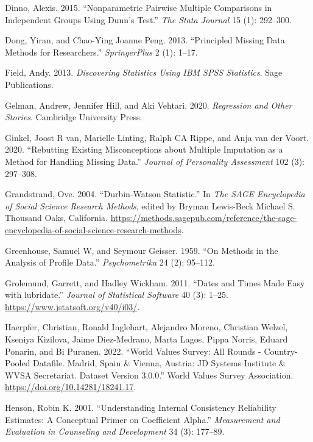 \documentclass[
  letterpaper,
]{krantz}
\newlength{\cslhangindent}
\newenvironment{CSLReferences}[2] %
 {\begin{list}{}{%
  \setlength{\itemindent}{0pt}
  \setlength{\leftmargin}{0pt}
  \setlength{\parsep}{0pt}
  \ifodd #1
   \setlength{\leftmargin}{\cslhangindent}
   \setlength{\itemindent}{-1\cslhangindent}
  \fi
  \setlength{\itemsep}{#2\baselineskip}}}
 {\end{list}}
\begin{document}
\begin{CSLReferences}{1}{0}
Dinno, Alexis. 2015. {``Nonparametric Pairwise Multiple Comparisons in
Independent Groups Using Dunn's Test.''} \emph{The Stata Journal} 15
(1): 292--300.

Dong, Yiran, and Chao-Ying Joanne Peng. 2013. {``Principled Missing Data
Methods for Researchers.''} \emph{SpringerPlus} 2 (1): 1--17.

Field, Andy. 2013. \emph{Discovering Statistics Using IBM SPSS
Statistics}. Sage Publications.

Gelman, Andrew, Jennifer Hill, and Aki Vehtari. 2020. \emph{Regression
and Other Stories}. Cambridge University Press.

Ginkel, Joost R van, Marielle Linting, Ralph CA Rippe, and Anja van der
Voort. 2020. {``Rebutting Existing Misconceptions about Multiple
Imputation as a Method for Handling Missing Data.''} \emph{Journal of
Personality Assessment} 102 (3): 297--308.

Grandstrand, Ove. 2004. {``Durbin-Watson Statistic.''} In \emph{The SAGE
Encyclopedia of Social Science Research Methods}, edited by Bryman
Lewis-Beck Michael S. Thousand Oaks, California.
\url{https://methods.sagepub.com/reference/the-sage-encyclopedia-of-social-science-research-methods}.

Greenhouse, Samuel W, and Seymour Geisser. 1959. {``On Methods in the
Analysis of Profile Data.''} \emph{Psychometrika} 24 (2): 95--112.

Grolemund, Garrett, and Hadley Wickham. 2011. {``Dates and Times Made
Easy with {lubridate}.''} \emph{Journal of Statistical Software} 40 (3):
1--25. \url{https://www.jstatsoft.org/v40/i03/}.

Haerpfer, Christian, Ronald Inglehart, Alejandro Moreno, Christian
Welzel, Kseniya Kizilova, Jaime Diez-Medrano, Marta Lagos, Pippa Norris,
Eduard Ponarin, and Bi Puranen. 2022. {``World Values Survey: All Rounds
- Country-Pooled Datafile. Madrid, Spain \& Vienna, Austria: JD Systems
Institute \& WVSA Secretariat. Dataset Version 3.0.0.''} World Values
Survey Association. \url{https://doi.org/10.14281/18241.17}.

Henson, Robin K. 2001. {``Understanding Internal Consistency Reliability
Estimates: A Conceptual Primer on Coefficient Alpha.''}
\emph{Measurement and Evaluation in Counseling and Development} 34 (3):
177--89.


\end{CSLReferences}
\end{document}
